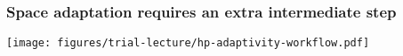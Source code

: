 \begin{frame}
  \frametitle{Space adaptation requires an extra intermediate step}
  \begin{center}
    \texttt{[image: figures/trial-lecture/hp-adaptivity-workflow.pdf]}
  \end{center}
\end{frame}
